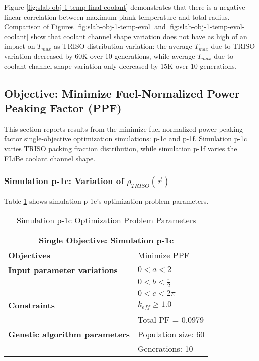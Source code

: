 Figure \ref{fig:slab-obj-1-temp-final-coolant} demonstrates that there is a negative 
linear correlation between maximum plank temperature and total radius. 
Comparison of Figures \ref{fig:slab-obj-1-temp-evol} and 
\ref{fig:slab-obj-1-temp-evol-coolant} show that coolant channel shape variation 
does not have as high of an impact on $T_{max}$ as \gls{TRISO} distribution variation:  
the average $T_{max}$ due to \gls{TRISO} variation decreased by 60K over 10 generations, 
while average $T_{max}$ due to coolant channel shape variation only decreased by 15K
over 10 generations. 

\subsection{Objective: Minimize Fuel-Normalized Power Peaking Factor (PPF)}
This section reports results from the minimize fuel-normalized power peaking factor 
single-objective optimization simulations: p-1c and p-1f. 
Simulation p-1c varies \gls{TRISO} packing fraction distribution, while simulation p-1f 
varies the \gls{FLiBe} coolant channel shape. 

\subsubsection{Simulation p-1c: Variation of $\rho_{TRISO}(\vec{r})$}
Table \ref{tab:simulationp1c} shows simulation p-1c's optimization problem parameters. 
\begin{table}[htbp!]
    \centering
    \onehalfspacing
    \caption{Simulation p-1c Optimization Problem Parameters}
	\label{tab:simulationp1c}
    \footnotesize
    \begin{tabular}{l|p{3cm}}
    \hline 
    \multicolumn{2}{c}{\textbf{Single Objective: Simulation p-1c}} \\
    \hline 
    \textbf{Objectives} & Minimize PPF \\
    \hline 
    \textbf{Input parameter variations} & $0<a<2$ \\
    & $0<b<\frac{\pi}{2}$ \\
    & $0<c<2\pi$ \\
    \hline
    \textbf{Constraints} & $k_{eff} \geq 1.0$\\ 
    & Total PF = 0.0979\\
    \hline 
    \textbf{Genetic algorithm parameters} & Population size: 60 \\
    & Generations: 10 \\
    \hline
    \end{tabular}
\end{table}

